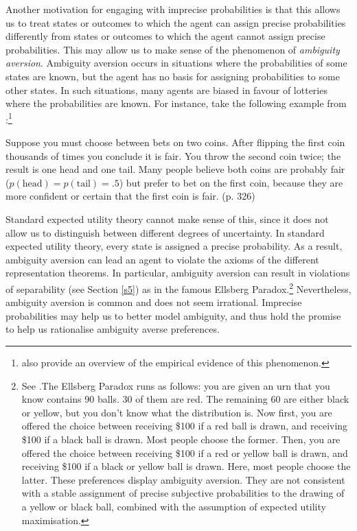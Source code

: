Another motivation for engaging with imprecise probabilities is that this allows us to treat states or outcomes to which the agent can assign precise probabilities differently from states or outcomes to which the agent cannot assign precise probabilities. This may allow us to make sense of the phenomenon of {\em ambiguity aversion}. Ambiguity aversion occurs in situations where the probabilities of some states are known, but the agent has no basis for assigning probabilities to some other states. In such situations, many agents are biased in favour of lotteries where the probabilities are known. For instance, take the following example from \citet{CamererWeber1992}:\footnote{\citet{CamererWeber1992} also provide an overview of the empirical evidence of this phenomenon.}

\begin{displayquote}
Suppose you must choose between bets on two coins. After flipping the first coin thousands of times you conclude it is fair. You throw the second coin twice; the result is one head and one tail. Many people believe both coins are probably fair ($p(\text{head}) = p(\text{tail})=.5$) but prefer to bet on the first coin, because they are more confident or certain that the first coin is fair. (p. 326)
\end{displayquote}

Standard expected utility theory cannot make sense of this, since it does not allow us to distinguish between different degrees of uncertainty. In standard expected utility theory, every state is assigned a precise probability. As a result, ambiguity aversion can lead an agent to violate the axioms of the different representation theorems. In particular, ambiguity aversion can result in violations of separability (see Section \ref{s5}) as in the famous Ellsberg Paradox.\footnote{See \citet{Ellsberg1961}.The Ellsberg Paradox runs as follows: you are given an urn that you know contains 90 balls. 30 of them are red. The remaining 60 are either black or yellow, but you don't know what the distribution is. Now first, you are offered the choice between receiving \$100 if a red ball is drawn, and receiving \$100 if a black ball is drawn. Most people choose the former. Then, you are offered the choice between receiving \$100 if a red or yellow ball is drawn, and receiving \$100 if a black or yellow ball is drawn. Here, most people choose the latter. These preferences display ambiguity aversion. They are not consistent with a stable assignment of precise subjective probabilities to the drawing of a yellow or black ball, combined with the assumption of expected utility maximisation.} Nevertheless, ambiguity aversion is common and does not seem irrational. Imprecise probabilities may help us to better model ambiguity, and thus hold the promise to help us rationalise ambiguity averse preferences.


